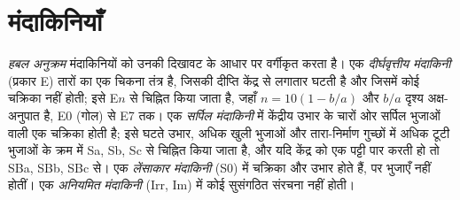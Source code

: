 \section{मंदाकिनियाँ}\label{sec:b3:milky-way-galaxies:galaxies}

\begin{definition}[हबल अनुक्रम; दीर्घवृत्तीय, लेंसाकार, सर्पिल और अनियमित मंदाकिनियाँ]\label{def:b3:milky-way-galaxies:types}
\emph{हबल अनुक्रम} मंदाकिनियों को
उनकी दिखावट के आधार पर वर्गीकृत करता है। एक \emph{दीर्घवृत्तीय मंदाकिनी}
(प्रकार E) तारों का एक चिकना तंत्र है, जिसकी दीप्ति
केंद्र से लगातार घटती है और जिसमें कोई चक्रिका नहीं होती; इसे E$n$ से चिह्नित किया जाता है, जहाँ $n = 10(1 - b/a)$
और $b/a$ दृश्य अक्ष-अनुपात है, E0 (गोल) से E7 तक।
एक \emph{सर्पिल मंदाकिनी} में केंद्रीय उभार के चारों ओर सर्पिल भुजाओं वाली एक चक्रिका होती है; इसे
घटते उभार, अधिक खुली भुजाओं और तारा-निर्माण गुच्छों में अधिक टूटी भुजाओं के क्रम में Sa, Sb, Sc से चिह्नित किया जाता है,
और यदि केंद्र को एक पट्टी पार करती हो तो SBa, SBb, SBc से।
एक \emph{लेंसाकार
मंदाकिनी} (S0) में चक्रिका और उभार होते हैं, पर भुजाएँ नहीं होतीं।
एक \emph{अनियमित मंदाकिनी} (Irr, Im) में
कोई सुसंगठित संरचना नहीं होती।
\end{definition}


